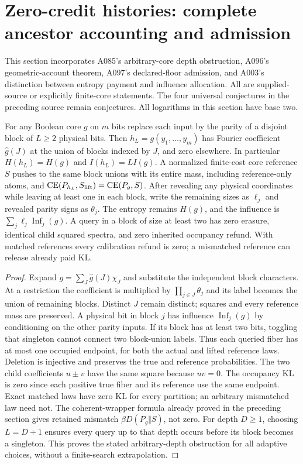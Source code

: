 \section{Zero-credit histories: complete ancestor accounting and admission}
This section incorporates A085's arbitrary-core depth obstruction,
A096's geometric-account theorem, A097's declared-floor admission, and
A003's distinction between entropy payment and influence allocation.
All are supplied-source or explicitly finite-core statements. The four
universal conjectures in the preceding source remain conjectures. All
logarithms in this section have base two.

\begin{lemma}\label{lem:v10lift}
For any Boolean core $g$ on $m$ bits replace each input by the parity of a
disjoint block of $L\ge2$ physical bits. Then $h_L=g(y_1,\ldots,y_m)$ has
Fourier coefficient $\widehat g(J)$ at the union of blocks indexed by $J$,
and zero elsewhere. In particular $H(h_L)=H(g)$ and $I(h_L)=LI(g)$.
A normalized finite-cost core reference $S$ pushes to the same block
unions with its entire mass, including reference-only atoms, and
$\operatorname{CE}(P_{h_L},S_{\rm lift})=\operatorname{CE}(P_g,S)$.
After revealing any physical coordinates while leaving at least one in
each block, write the remaining sizes as $\ell_j$ and revealed parity
signs as $\theta_j$. The entropy remains $H(g)$, and the influence is
$\sum_j\ell_j\operatorname{Inf}_j(g)$. A query in a block of size at least
two has zero erasure, identical child squared spectra, and zero inherited
occupancy refund. With matched references every calibration refund is
zero; a mismatched reference can release already paid KL.
\end{lemma}
\begin{proof}
Expand $g=\sum_J\widehat g(J)\chi_J$ and substitute the independent block
characters. At a restriction the coefficient is multiplied by
$\prod_{j\in J}\theta_j$ and its label becomes the union of remaining
blocks. Distinct $J$ remain distinct; squares and every reference mass
are preserved. A physical bit in block $j$ has influence
$\operatorname{Inf}_j(g)$ by conditioning on the other parity inputs.
If its block has at least two bits, toggling that singleton cannot connect
two block-union labels. Thus each queried fiber has at most one occupied
endpoint, for both the actual and lifted reference laws. Deletion is
injective and preserves the true and reference probabilities. The two
child coefficients $u\pm v$ have the same square because $uv=0$.
The occupancy KL is zero since each positive true fiber and its reference
use the same endpoint. Exact matched laws have zero KL for every
partition; an arbitrary mismatched law need not. The coherent-wrapper
formula already proved in the preceding section gives retained mismatch
$\beta D(P_g\Vert S)$, not zero. For depth $D\ge1$, choosing $L=D+1$
ensures every query up to that depth occurs before its block becomes a
singleton. This proves the stated arbitrary-depth obstruction for all
adaptive choices, without a finite-search extrapolation.
\end{proof}

